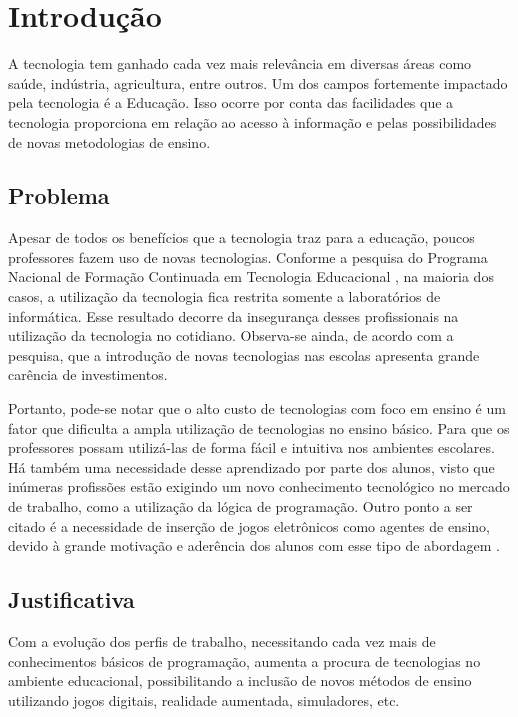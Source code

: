 
\chapter{Introdução}\label{intro}

A tecnologia tem ganhado cada vez mais relevância em diversas áreas como saúde, indústria, agricultura, entre outros. Um dos campos fortemente impactado pela tecnologia é a Educação. Isso ocorre por conta das facilidades que a tecnologia proporciona em relação ao acesso à informação e pelas possibilidades de novas metodologias de ensino. 


\section{Problema}

Apesar de todos os benefícios que a tecnologia traz para a educação, poucos professores fazem uso de novas tecnologias. Conforme a pesquisa do Programa Nacional de Formação Continuada em Tecnologia Educacional \cite{suenia_andre_2012}, na maioria dos casos, a utilização da tecnologia fica restrita somente a laboratórios de informática. Esse resultado decorre da insegurança desses profissionais na utilização da tecnologia no cotidiano. Observa-se ainda, de acordo com a pesquisa, que a introdução de novas tecnologias nas escolas apresenta grande carência de investimentos.

Portanto, pode-se notar que o alto custo de  tecnologias com foco em ensino é um fator que dificulta a ampla utilização de tecnologias no ensino básico. Para que os professores possam utilizá-las de forma fácil e intuitiva nos ambientes escolares. Há também uma necessidade desse aprendizado por parte dos alunos, visto que inúmeras profissões estão exigindo um novo conhecimento tecnológico no mercado de trabalho, como a utilização da lógica de programação. Outro ponto a ser citado é a necessidade de inserção de jogos eletrônicos como agentes de ensino, devido à grande motivação e aderência dos alunos com esse tipo de abordagem \cite{kaue_tatiane_marcos_2017}.


\section{Justificativa}

Com a evolução dos perfis de trabalho, necessitando cada vez mais de conhecimentos básicos de programação, aumenta a procura de tecnologias no ambiente educacional, possibilitando a inclusão de novos métodos de ensino utilizando jogos digitais, realidade aumentada, simuladores, etc.

